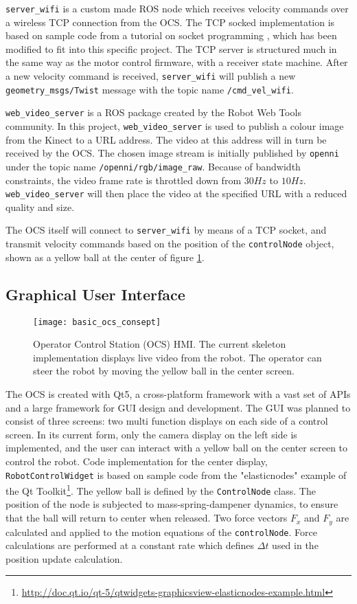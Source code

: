 \texttt{server\_wifi} is a custom made \ac{ROS} node which receives velocity commands over a wireless TCP connection from the \ac{OCS}. The TCP socked implementation is based on sample code from a tutorial on socket programming \cite{tcp_tut}, which has been modified to fit into this specific project. The TCP server is structured much in the same way as the motor control firmware, with a receiver state machine. After a new velocity command is received, \texttt{server\_wifi} will publish a new \texttt{geometry\_msgs/Twist} message with the topic name \texttt{/cmd\_vel\_wifi}.

\texttt{web\_video\_server} is a \ac{ROS} package created by the Robot Web Tools community. In this project, \texttt{web\_video\_server} is used to publish a colour image from the Kinect to a URL address. The video at this address will in turn be received by the \ac{OCS}. The chosen image stream is initially published by \texttt{openni} under the topic name \texttt{/openni/rgb/image\_raw}. Because of bandwidth constraints, the video frame rate is throttled down from $30 Hz$ to $10 Hz$.  \texttt{web\_video\_server} will then place the video at the specified URL with a reduced quality and size. 

The \ac{OCS} itself will connect to \texttt{server\_wifi} by means of a TCP socket, and transmit velocity commands based on the position of the \texttt{controlNode} object, shown as a yellow ball at the center of figure \ref{fig:ocs}.

\subsection{Graphical User Interface}

\begin{figure}[H]
	\centering
	\texttt{[image: basic\_ocs\_consept]}
	\caption{Operator Control Station (OCS) \ac{HMI}. The current skeleton implementation displays live video from the robot. The operator can steer the robot by moving the yellow ball in the center screen. }
	\label{fig:ocs}
\end{figure}


The \ac{OCS} is created with Qt5, a cross-platform framework with a vast set of APIs and a large framework for \ac{GUI} design and development. The \ac{GUI} was planned to consist of three screens: two multi function displays on each side of a control screen. In its current form, only the camera display on the left side is implemented, and the user can interact with a yellow ball on the center screen to control the robot. Code implementation for the center display, \texttt{RobotControlWidget} is based on sample code from the "elasticnodes" example of the Qt Toolkit\footnote{\url{http://doc.qt.io/qt-5/qtwidgets-graphicsview-elasticnodes-example.html}}. The yellow ball is defined by the \texttt{ControlNode} class. The position of the node is subjected to mass-spring-dampener dynamics, to ensure that the ball will return to center when released. Two force vectors $F_x$ and $F_y$ are calculated and applied to the motion equations of the \texttt{controlNode}. Force calculations are performed at a constant rate which defines $\Delta t$ used in the position update calculation.  


